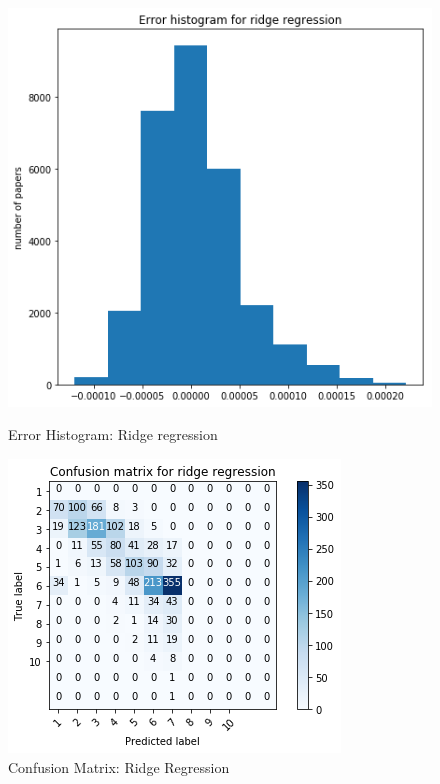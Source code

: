 \documentclass[a4paper, 11pt]{article}
\begin{document}
\begin{figure}[!htb]
    \includegraphics[width=\linewidth]{error_hist_ridge.png}
    \caption{Error Histogram: Ridge regression}
    \label{fig:error_hist_ridge}
\endminipage\hfill
{}%
\includegraphics[width=\linewidth]{confmat_ridge.png}
     \caption{Confusion Matrix: Ridge Regression}
    \label{fig:confmat_ridge}
\endminipage
\end{figure}
\end{document}
